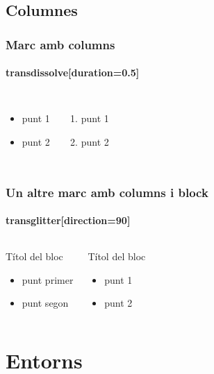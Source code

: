 \documentclass[12pt]{beamer}
\begin{document}
\subsection{Columnes}
\begin{frame}
  \frametitle{Marc amb columns}
  \framesubtitle{transdissolve[duration=0.5]}
  \begin{columns}
			  \begin{itemize}
				\item punt 1
				\item punt 2
			  \end{itemize}
			  \begin{enumerate}
				\item punt 1
				\item punt 2
			  \end{enumerate}
  \end{columns} 
  \transdissolve[duration=0.5]
  
\end{frame}
\begin{frame}
  \frametitle{Un altre marc amb columns i block}
  \framesubtitle{transglitter[direction=90]}
  \begin{columns}
			    \begin{block}{Títol del bloc}
				\begin{itemize}
					\item punt primer
					\item punt segon
				\end{itemize}
\end{block}
			    \begin{block}{Títol del bloc}
				\begin{itemize}
					\item punt 1
					\item punt 2
				\end{itemize}
\end{block}
  \end{columns} 
  \transglitter[direction=90]
  

\end{frame}
\section{Entorns}
\end{document}
